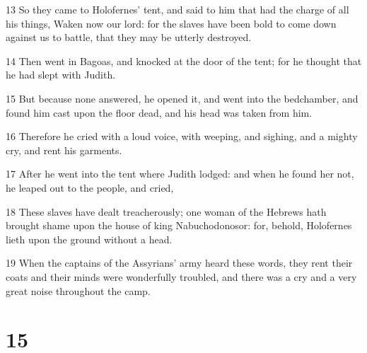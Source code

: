 \par 13 So they came to Holofernes' tent, and said to him that had the charge of all his things, Waken now our lord: for the slaves have been bold to come down against us to battle, that they may be utterly destroyed.
\par 14 Then went in Bagoas, and knocked at the door of the tent; for he thought that he had slept with Judith.
\par 15 But because none answered, he opened it, and went into the bedchamber, and found him cast upon the floor dead, and his head was taken from him.
\par 16 Therefore he cried with a loud voice, with weeping, and sighing, and a mighty cry, and rent his garments.
\par 17 After he went into the tent where Judith lodged: and when he found her not, he leaped out to the people, and cried,
\par 18 These slaves have dealt treacherously; one woman of the Hebrews hath brought shame upon the house of king Nabuchodonosor: for, behold, Holofernes lieth upon the ground without a head.
\par 19 When the captains of the Assyrians' army heard these words, they rent their coats and their minds were wonderfully troubled, and there was a cry and a very great noise throughout the camp.

\chapter{15}

